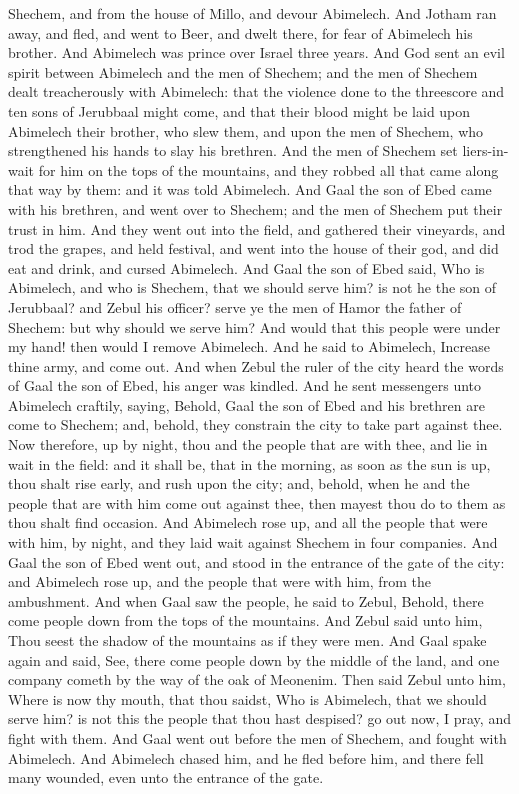 Shechem, and from the house of Millo, and devour Abimelech. And Jotham ran away, and fled, and went to Beer, and dwelt there, for fear of Abimelech his brother.  And Abimelech was prince over Israel three years. And God sent an evil spirit between Abimelech and the men of Shechem; and the men of Shechem dealt treacherously with Abimelech: that the violence done to the threescore and ten sons of Jerubbaal might come, and that their blood might be laid upon Abimelech their brother, who slew them, and upon the men of Shechem, who strengthened his hands to slay his brethren. And the men of Shechem set liers-in-wait for him on the tops of the mountains, and they robbed all that came along that way by them: and it was told Abimelech.  And Gaal the son of Ebed came with his brethren, and went over to Shechem; and the men of Shechem put their trust in him. And they went out into the field, and gathered their vineyards, and trod the grapes, and held festival, and went into the house of their god, and did eat and drink, and cursed Abimelech. And Gaal the son of Ebed said, Who is Abimelech, and who is Shechem, that we should serve him? is not he the son of Jerubbaal? and Zebul his officer? serve ye the men of Hamor the father of Shechem: but why should we serve him? And would that this people were under my hand! then would I remove Abimelech. And he said to Abimelech, Increase thine army, and come out.  And when Zebul the ruler of the city heard the words of Gaal the son of Ebed, his anger was kindled. And he sent messengers unto Abimelech craftily, saying, Behold, Gaal the son of Ebed and his brethren are come to Shechem; and, behold, they constrain the city to take part against thee. Now therefore, up by night, thou and the people that are with thee, and lie in wait in the field: and it shall be, that in the morning, as soon as the sun is up, thou shalt rise early, and rush upon the city; and, behold, when he and the people that are with him come out against thee, then mayest thou do to them as thou shalt find occasion.  And Abimelech rose up, and all the people that were with him, by night, and they laid wait against Shechem in four companies. And Gaal the son of Ebed went out, and stood in the entrance of the gate of the city: and Abimelech rose up, and the people that were with him, from the ambushment. And when Gaal saw the people, he said to Zebul, Behold, there come people down from the tops of the mountains. And Zebul said unto him, Thou seest the shadow of the mountains as if they were men. And Gaal spake again and said, See, there come people down by the middle of the land, and one company cometh by the way of the oak of Meonenim. Then said Zebul unto him, Where is now thy mouth, that thou saidst, Who is Abimelech, that we should serve him? is not this the people that thou hast despised? go out now, I pray, and fight with them. And Gaal went out before the men of Shechem, and fought with Abimelech. And Abimelech chased him, and he fled before him, and there fell many wounded, even unto the entrance of the gate.  